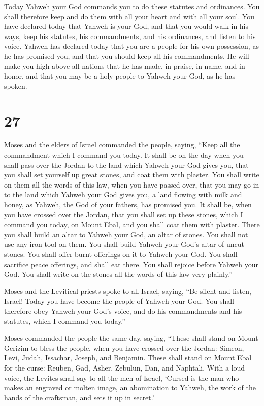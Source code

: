  Today Yahweh your God commands you to do these statutes
and ordinances. You shall therefore keep and do them with all your heart
and with all your soul.  You have declared today that
Yahweh is your God, and that you would walk in his ways, keep his
statutes, his commandments, and his ordinances, and listen to his voice.
 Yahweh has declared today that you are a people for his
own possession, as he has promised you, and that you should keep all his
commandments.  He will make you high above all nations
that he has made, in praise, in name, and in honor, and that you may be
a holy people to Yahweh your God, as he has spoken.

\hypertarget{section-26}{%
\section{27}\label{section-26}}

 Moses and the elders of Israel commanded the people,
saying, ``Keep all the commandment which I command you today.
 It shall be on the day when you shall pass over the
Jordan to the land which Yahweh your God gives you, that you shall set
yourself up great stones, and coat them with plaster.  You
shall write on them all the words of this law, when you have passed
over, that you may go in to the land which Yahweh your God gives you, a
land flowing with milk and honey, as Yahweh, the God of your fathers,
has promised you.  It shall be, when you have crossed over
the Jordan, that you shall set up these stones, which I command you
today, on Mount Ebal, and you shall coat them with plaster.
 There you shall build an altar to Yahweh your God, an
altar of stones. You shall not use any iron tool on them. 
You shall build Yahweh your God's altar of uncut stones. You shall offer
burnt offerings on it to Yahweh your God.  You shall
sacrifice peace offerings, and shall eat there. You shall rejoice before
Yahweh your God.  You shall write on the stones all the
words of this law very plainly.''

 Moses and the Levitical priests spoke to all Israel,
saying, ``Be silent and listen, Israel! Today you have become the people
of Yahweh your God.  You shall therefore obey Yahweh your
God's voice, and do his commandments and his statutes, which I command
you today.''

 Moses commanded the people the same day, saying,
 ``These shall stand on Mount Gerizim to bless the
people, when you have crossed over the Jordan: Simeon, Levi, Judah,
Issachar, Joseph, and Benjamin.  These shall stand on
Mount Ebal for the curse: Reuben, Gad, Asher, Zebulun, Dan, and
Naphtali.  With a loud voice, the Levites shall say to
all the men of Israel,  `Cursed is the man who makes an
engraved or molten image, an abomination to Yahweh, the work of the
hands of the craftsman, and sets it up in secret.'

